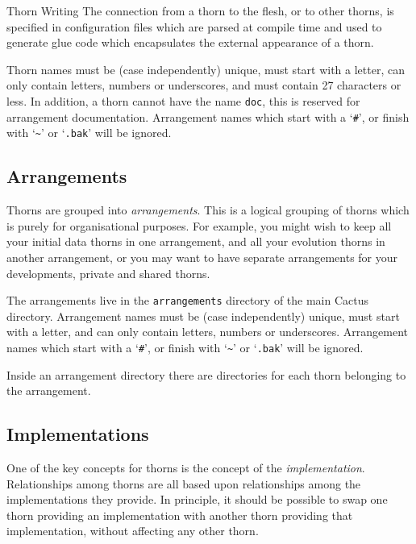 \begin{cactuspart}{Thorn Writing}
The connection from a thorn to the flesh, or to other thorns, is specified in
configuration files which are parsed at compile time and used to generate
glue code which encapsulates the external appearance of a thorn.

Thorn names must be (case independently) unique, must start with a letter,
can only contain
letters, numbers or underscores, and must contain 27 characters or less.
In addition, a thorn cannot have the name \texttt{doc}, this is reserved
for arrangement documentation. Arrangement names which start with a
`\texttt{\#}', or finish with `\texttt{\~{}}' or `\texttt{.bak}' will be
ignored.


\subsection{Arrangements}
\label{sec:arrangements}

Thorns are grouped into \textit{arrangements}.  This is a logical grouping of
thorns which is purely for organisational purposes. For example,
you might wish to keep all your initial data thorns in one arrangement,
and all your evolution thorns in another arrangement, or you may want
to have separate arrangements for your developments, private and shared
thorns.

The arrangements live in the \texttt{arrangements} directory of the main
Cactus directory.  Arrangement names must be (case independently) unique,
must start with a letter,
and can only contain
letters, numbers or underscores. Arrangement names which start with a
`\texttt{\#}', or finish with `\texttt{\~{}}' or `\texttt{.bak}' will be
ignored.

Inside an arrangement directory there are directories for each thorn
belonging to the arrangement.


\subsection{Implementations}

\label{sec:implementations}

One of the key concepts for thorns is the concept of the \textit{implementation}.
Relationships among thorns are all based upon relationships among the
implementations they provide.
In principle, it should be possible to swap one thorn providing an
implementation with another thorn providing that implementation,
without affecting any other thorn.


\end{cactuspart}
